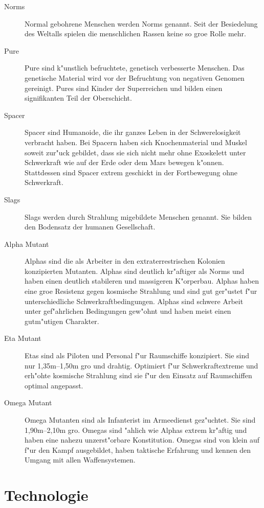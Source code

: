 \begin{appendices}
\begin{description}
\item [Norms] Normal gebohrene Menschen werden Norms genannt. Seit der Besiedelung des Weltalls spielen die
      menschlichen Rassen keine so gro\3e Rolle mehr.
\item [Pure] Pure sind k"unstlich befruchtete, genetisch verbesserte Menschen. Das genetische Material wird vor der
      Befruchtung von negativen Genomen gereinigt. Pures sind Kinder der Superreichen und bilden einen signifikanten Teil der Oberschicht.
\item [Spacer] Spacer sind Humanoide, die ihr ganzes Leben in der Schwerelosigkeit verbracht haben. Bei Spacern haben
      sich Knochenmaterial und Muskel soweit zur"uck gebildet, dass sie sich nicht mehr ohne Exoskelett unter Schwerkraft wie auf der Erde oder dem Mars bewegen k"onnen. Stattdessen sind Spacer extrem geschickt in der Fortbewegung ohne Schwerkraft.
\item [Slags] Slags werden durch Strahlung mi\3gebildete Menschen genannt. Sie bilden den Bodensatz der
      humanen Gesellschaft.
\item [Alpha Mutant] Alphas sind die als Arbeiter in den extraterrestrischen Kolonien konzipierten Mutanten.
      Alphas sind deutlich kr"aftiger als Norms und haben einen deutlich stabileren und massigeren K"orperbau. Alphas haben eine gro\3e Resistenz gegen kosmische Strahlung und sind gut ger"ustet f"ur unterschiedliche Schwerkraftbedingungen. Alphas sind schwere Arbeit unter gef"ahrlichen Bedingungen gew"ohnt und haben meist einen gutm"utigen Charakter.
\item [Eta Mutant] Etas sind als Piloten und Personal f"ur Raumschiffe konzipiert. Sie sind nur 1,35m--1,50m gro\3
      und drahtig. Optimiert f"ur Schwerkraftextreme und erh"ohte kosmische Strahlung sind sie f"ur den Einsatz auf Raumschiffen optimal angepasst.
\item [Omega Mutant] Omega Mutanten sind als Infanterist im Armeedienst gez"uchtet. Sie sind 1,90m--2,10m gro\3.
      Omegas sind "ahlich wie Alphas extrem kr"aftig und haben eine nahezu unzerst"orbare Konstitution. Omegas sind von klein auf f"ur den Kampf ausgebildet, haben taktische Erfahrung und kennen den Umgang mit allen Waffensystemen.
\end{description}

\section{Technologie}


\end{appendices}
